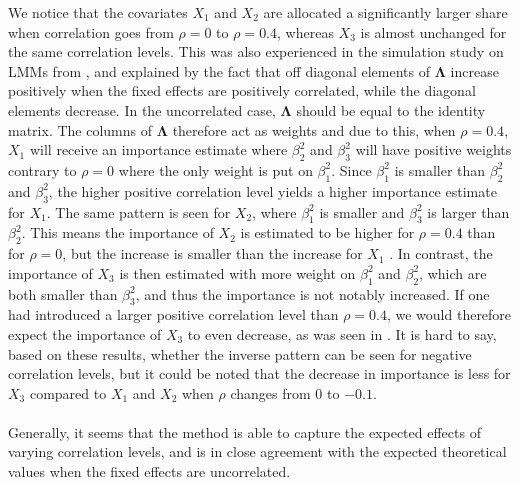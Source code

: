 We notice that the covariates $X_1$ and $X_2$ are allocated a significantly larger share when correlation goes from $\rho=0$ to $\rho=0.4$, whereas $X_3$ is almost unchanged for the same correlation levels. This was also experienced in the simulation study on LMMs from \citet{Arnstad}, and explained by the fact that off diagonal elements of $\boldsymbol{\Lambda}$ increase positively when the fixed effects are positively correlated, while the diagonal elements decrease. In the uncorrelated case, $\boldsymbol{\Lambda}$ should be equal to the identity matrix. The columns of $\boldsymbol{\Lambda}$ therefore act as weights and due to this, when $\rho=0.4$, $X_1$ will receive an importance estimate where $\beta_2^2$ and $\beta_3^2$ will have positive weights contrary to $\rho=0$ where the only weight is put on $\beta_1^2$. Since $\beta_1^2$ is smaller than $\beta_2^2$ and $\beta_3^2$, the higher positive correlation level yields a higher importance estimate for $X_1$. The same pattern is seen for $X_2$, where $\beta_1^2$ is smaller and $\beta_3^2$ is larger than $\beta_2^2$. This means the importance of $X_2$ is estimated to be higher for $\rho=0.4$ than for $\rho=0$, but the increase is smaller than the increase for $X_1$ \citep{Arnstad}. In contrast, the importance of $X_3$ is then estimated with more weight on $\beta_1^2$ and $\beta_2^2$, which are both smaller than $\beta_3^2$, and thus the importance is not notably increased. If one had introduced a larger positive correlation level than $\rho=0.4$, we would therefore expect the importance of $X_3$ to even decrease, as was seen in \citet{Arnstad}. It is hard to say, based on these results, whether the inverse pattern can be seen for negative correlation levels, but it could be noted that the decrease in importance is less for $X_3$ compared to $X_1$ and $X_2$ when $\rho$ changes from $0$ to $-0.1$.
\\
\\
Generally, it seems that the method is able to capture the expected effects of varying correlation levels, and is in close agreement with the expected theoretical values when the fixed effects are uncorrelated.

